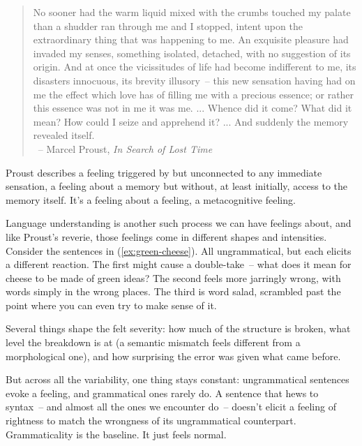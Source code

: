 \begin{quote}
    No sooner had the warm liquid mixed with the crumbs touched my palate than a shudder ran through me and I stopped, intent upon the extraordinary thing that was happening to me. An exquisite pleasure had invaded my senses, something isolated, detached, with no suggestion of its origin. And at once the vicissitudes of life had become indifferent to me, its disasters innocuous, its brevity illusory~-- this new sensation having had on me the effect which love has of filling me with a precious essence; or rather this essence was not in me it was me. ... Whence did it come? What did it mean? How could I seize and apprehend it? ... And suddenly the memory revealed itself. \\\hfill~-- Marcel Proust, \textit{In Search of Lost Time}
\end{quote}

Proust describes a feeling triggered by but unconnected to any immediate sensation, a feeling about a memory but without, at least initially, access to the memory itself. It's a feeling about a feeling, a metacognitive feeling.

Language understanding is another such process we can have feelings about, and like Proust's reverie, those feelings come in different shapes and intensities. Consider the sentences in (\ref{ex:green-cheese}). All ungrammatical, but each elicits a different reaction. The first might cause a double-take~-- what does it mean for cheese to be made of green ideas? The second feels more jarringly wrong, with words simply in the wrong places. The third is word salad, scrambled past the point where you can even try to make sense of it.


\ea\label{ex:green-cheese}
    \z
\z

Several things shape the felt severity: how much of the structure is broken, what level the breakdown is at (a semantic mismatch feels different from a morphological one), and how surprising the error was given what came before.

But across all the variability, one thing stays constant: ungrammatical sentences evoke a feeling, and grammatical ones rarely do. A sentence that hews to syntax~-- and almost all the ones we encounter do~-- doesn't elicit a feeling of rightness to match the wrongness of its ungrammatical counterpart. Grammaticality is the baseline. It just feels normal.

